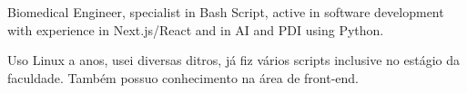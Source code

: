 Biomedical Engineer, specialist in Bash Script, active in software development with experience in Next.js/React and in AI and PDI using Python.


Uso Linux a anos, usei diversas ditros, já fiz vários scripts inclusive no estágio da faculdade. Também possuo conhecimento na área de front-end.
